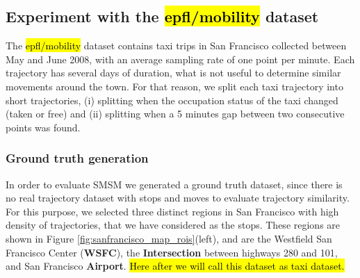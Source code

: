 \documentclass[12pt]{article}
\begin{document}
\subsection{Experiment with the \hl{epfl/mobility} dataset}\label{sec:crawdad}

The \hl{epfl/mobility} dataset contains taxi trips in San Francisco collected between May and June 2008, with an average sampling rate of one point per minute. Each trajectory has several days of duration, what is not useful to determine similar movements around the town. For that reason, we split each taxi trajectory into short trajectories, (i) splitting when the occupation status of the taxi changed (taken or free) and (ii) splitting when a 5 minutes gap between two consecutive points was found.

\subsubsection{Ground truth generation}
In order to evaluate SMSM we generated a ground truth dataset, since there is no real trajectory dataset with stops and moves to evaluate trajectory similarity. For this purpose, we selected three distinct regions in San Francisco with high density of trajectories, that we have considered as the stops. These regions are shown in Figure \ref{fig:sanfrancisco_map_rois}(left), and are the Westfield San Francisco Center (\textbf{WSFC}), the \textbf{Intersection} between highways 280 and 101, and San Francisco \textbf{Airport}. \hl{Here after we will call this dataset as taxi dataset.}
\end{document}
